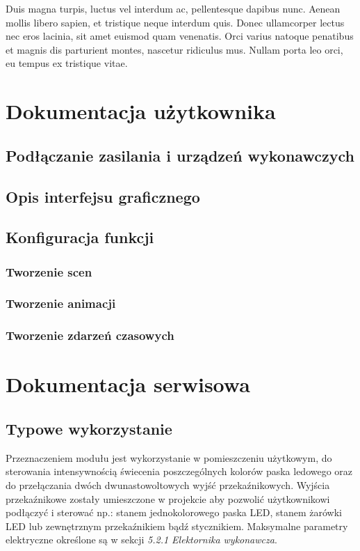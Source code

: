 \documentclass[12pt, eng, twoside, openany, final]{mgr}
\begin{document}
    Duis magna turpis, luctus vel interdum ac, pellentesque dapibus nunc. Aenean mollis libero sapien, et tristique neque interdum quis. Donec ullamcorper lectus nec eros lacinia, sit amet euismod quam venenatis. Orci varius natoque penatibus et magnis dis parturient montes, nascetur ridiculus mus. Nullam porta leo orci, eu tempus ex tristique vitae.
%
\chapter{Dokumentacja użytkownika}
\thispagestyle{fancy}
    \section{Podłączanie zasilania i urządzeń wykonawczych}
    \section{Opis interfejsu graficznego}
    \section{Konfiguracja funkcji}
        \subsection{Tworzenie scen}
        \subsection{Tworzenie animacji}
        \subsection{Tworzenie zdarzeń czasowych}
%
\chapter{Dokumentacja serwisowa}
\thispagestyle{fancy}
    \section{Typowe wykorzystanie}
    Przeznaczeniem modułu jest wykorzystanie w pomieszczeniu użytkowym, do sterowania intensywnością świecenia poszczególnych kolorów paska ledowego oraz do przełączania dwóch dwunastowoltowych wyjść przekaźnikowych. Wyjścia przekaźnikowe zostały umieszczone w projekcie aby pozwolić użytkownikowi podłączyć i sterować np.: stanem jednokolorowego paska LED, stanem żarówki LED lub zewnętrznym przekaźnikiem bądź stycznikiem. Maksymalne parametry elektryczne określone są w sekcji \emph{5.2.1 Elektornika wykonawcza}.
    \newpage
    
\end{document}
